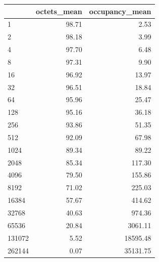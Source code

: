 \begin{tabular}{lrr}
\toprule
 & octets_mean & occupancy_mean \\
\midrule
1 & 98.71 & 2.53 \\
2 & 98.18 & 3.99 \\
4 & 97.70 & 6.48 \\
8 & 97.31 & 9.90 \\
16 & 96.92 & 13.97 \\
32 & 96.51 & 18.84 \\
64 & 95.96 & 25.47 \\
128 & 95.16 & 36.18 \\
256 & 93.86 & 51.35 \\
512 & 92.09 & 67.98 \\
1024 & 89.34 & 89.22 \\
2048 & 85.34 & 117.30 \\
4096 & 79.50 & 155.86 \\
8192 & 71.02 & 225.03 \\
16384 & 57.67 & 414.62 \\
32768 & 40.63 & 974.36 \\
65536 & 20.84 & 3061.11 \\
131072 & 5.52 & 18595.48 \\
262144 & 0.07 & 35131.75 \\
\bottomrule
\end{tabular}
